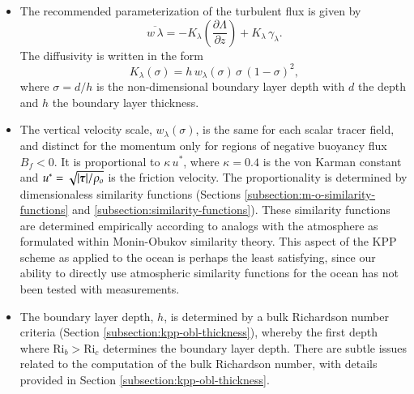 \begin{itemize}

\item The recommended parameterization of the turbulent flux is given
  by
\begin{equation}
  \overline{w \, \lambda} = -K_{\lambda} \left( \frac{\partial \Lambda}{\partial z}  \right)
   +  K_{\lambda}  \, \gamma_{\lambda}.
\label{eq:kpp-parameterization-summary}
\end{equation}
 The diffusivity is written in the form 
\begin{equation}
  K_{\lambda}(\sigma) = h \, w_{\lambda}(\sigma) \, \sigma \, (1-\sigma)^{2},
\label{eq:kpp-diffusivity}
\end{equation}
where $\sigma = d/h$ is the non-dimensional boundary layer depth with
$d$ the depth and $h$ the boundary layer thickness.  


\item The vertical velocity scale, $w_{\lambda}(\sigma)$, is the same
  for each scalar tracer field, and distinct for the momentum only for
  regions of negative buoyancy flux $B_{f} < 0$.  It is proportional
  to $\kappa \, u^{*}$, where $\kappa = 0.4$ is the von Karman
  constant and $u^{*} = \sqrt{|\mbox{\boldmath $\tau$}|/\rho_{o}}$ is the friction
  velocity.  The proportionality is determined by dimensionaless
  similarity functions (Sections
  \ref{subsection:m-o-similarity-functions} and
  \ref{subsection:similarity-functions}).  These similarity functions
  are determined empirically according to analogs with the atmosphere
  as formulated within Monin-Obukov similarity theory.  This aspect of
  the KPP scheme as applied to the ocean is perhaps the least
  satisfying, since our ability to directly use atmospheric similarity
  functions for the ocean has not been tested with measurements.

\item The boundary layer depth, $h$, is determined by a bulk
  Richardson number criteria (Section
  \ref{subsection:kpp-obl-thickness}), whereby the first depth where
  $\mbox{Ri}_{b} > \mbox{Ri}_{c}$ determines the boundary layer depth.
  There are subtle issues related to the computation of the bulk
  Richardson number, with details provided in Section
  \ref{subsection:kpp-obl-thickness}.


\end{itemize}
